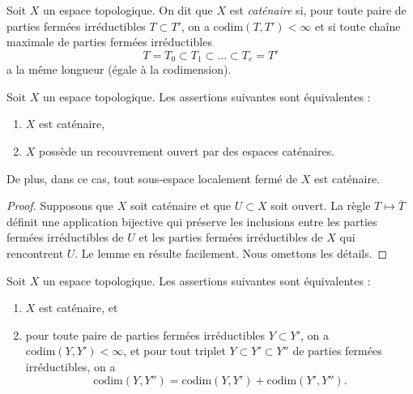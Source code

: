 \begin{definition}
\label{definition-catenary}
Soit $X$ un espace topologique. On dit que $X$ est {\it caténaire} si, pour
toute paire de parties fermées irréductibles $T \subset T'$, on a
$\text{codim}(T, T') < \infty$ et si toute chaîne maximale de parties fermées
irréductibles
$$
T = T_0 \subset T_1 \subset \ldots \subset T_e = T'
$$
a la même longueur (égale à la codimension).
\end{definition}

\begin{lemma}
\label{lemma-catenary}
Soit $X$ un espace topologique.
Les assertions suivantes sont équivalentes :
\begin{enumerate}
\item $X$ est caténaire,
\item $X$ possède un recouvrement ouvert par des espaces caténaires.
\end{enumerate}
De plus, dans ce cas, tout sous-espace localement fermé de $X$ est caténaire.
\end{lemma}

\begin{proof}
Supposons que $X$ soit caténaire et que $U \subset X$ soit ouvert.
La règle $T \mapsto \overline{T}$ définit une application bijective qui
préserve les inclusions entre les parties fermées irréductibles de $U$ et les
parties fermées irréductibles de $X$ qui rencontrent $U$.
Le lemme en résulte facilement. Nous omettons les détails.
\end{proof}

\begin{lemma}
\label{lemma-catenary-in-codimension}
Soit $X$ un espace topologique. Les assertions suivantes sont équivalentes :
\begin{enumerate}
\item $X$ est caténaire, et
\item pour toute paire de parties fermées irréductibles $Y \subset Y'$, on a
$\text{codim}(Y, Y') < \infty$, et pour tout triplet
$Y \subset Y' \subset Y''$ de parties fermées irréductibles, on a
$$
\text{codim}(Y, Y'') = \text{codim}(Y, Y') + \text{codim}(Y', Y'').
$$
\end{enumerate}
\end{lemma}

